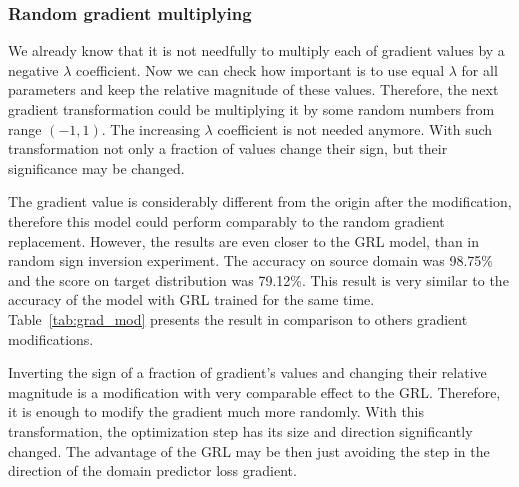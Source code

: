 \documentclass{article}
\begin{document}
\subsubsection{Random gradient multiplying}
We already know that it is not needfully to multiply each of gradient values by a negative $\lambda$ coefficient. Now we can check how important is to use equal $\lambda$ for all parameters and keep the relative magnitude of these values. Therefore, the next gradient transformation could be multiplying it by some random numbers from range $(-1, 1)$. The increasing $\lambda$ coefficient is not needed anymore. With such transformation not only a fraction of values change their sign, but their significance may be changed. 
\par
The gradient value is considerably different from the origin after the modification, therefore this model could perform comparably to the random gradient replacement. However, the results are even closer to the GRL model, than in random sign inversion experiment. The accuracy on source domain was 98.75\% and the score on target distribution was 79.12\%. This result is very similar to the accuracy of the model with GRL trained for the same time. Table~\ref{tab:grad_mod} presents the result in comparison to others gradient modifications.
\par
Inverting the sign of a fraction of gradient's values and changing their relative magnitude is a modification with very comparable effect to the GRL. Therefore, it is enough to modify the gradient much more randomly. With this transformation, the optimization step has its size and direction significantly changed. The advantage of the GRL may be then just avoiding the step in the direction of the domain predictor loss gradient.
\end{document}
